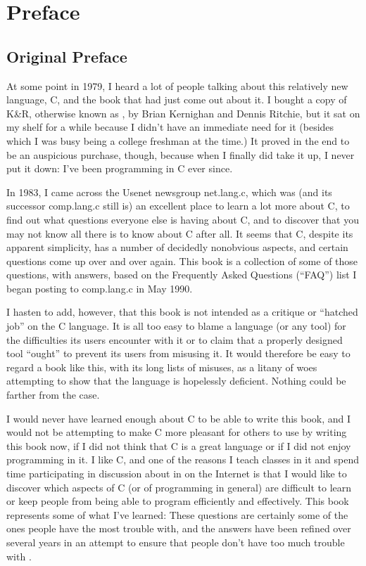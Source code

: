 \chapter*{Preface}

\section*{Original Preface}

\initfaq

At some point in 1979, I heard a lot of people talking about this relatively
new language, C, and the book that had just come out about it. I bought a
copy of K\&R, otherwise known as , by Brian
Kernighan and Dennis Ritchie, but it sat on my shelf for a while because I
didn't have an immediate need for it (besides which I was busy being a college
freshman at the time.)  It proved in the end to be an auspicious purchase,
though, because when I finally did take it up, I never put it down: I've been
programming in C ever since.

In 1983, I came across the Usenet newsgroup net.lang.c, which was (and
its successor comp.lang.c still is) an excellent place to learn a lot more about
C, to find out what questions everyone else is having about C, and to discover
that you may not know all there is to know about C after all.  It seems that
C, despite its apparent simplicity, has a number of decidedly nonobvious 
aspects, and certain questions come up over and over again.  This book is a
collection of some of those questions, with answers, based on the Frequently
Asked Questions (``FAQ'') list I began posting to comp.lang.c in May 1990.

I hasten to add, however, that this book is not intended as a critique or
``hatched job'' on the C language.  It is all too easy to blame a language
(or any tool) for the difficulties its users encounter with it or to claim
that a properly designed tool ``ought'' to prevent its users from misusing it.
It would therefore be easy to regard a book like this, with its long lists of
misuses, as a litany of woes attempting to show that the language is hopelessly
deficient. Nothing could be farther from the case.

I would never have learned enough about C to be able to write this book,
and I would not be attempting to make C more pleasant for others to use by
writing this book now, if I did not think that C is a great language or if I
did not enjoy programming in it. I  like C, and one of the reasons I
teach classes in it and spend time participating in discussion about in on the
Internet is that I would like to discover which aspects of C (or of programming
in general) are difficult to learn or keep people from being able to program
efficiently and effectively.  This book represents some of what I've learned:
These questions are certainly some of the ones people have the most trouble
with, and the answers have been refined over several years in an attempt to
ensure that people don't have too much trouble with .


